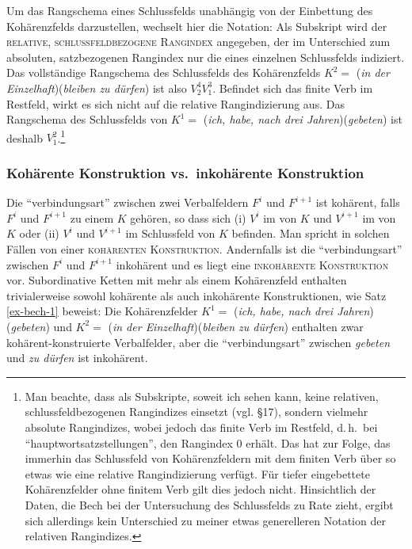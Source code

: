 Um das Rangschema eines Schlussfelds unabhängig von der Einbettung des Kohärenzfelds darzustellen, wechselt hier die Notation: Als Subskript wird der \textsc{relative, schlussfeldbezogene Rangindex} angegeben, der im Unterschied zum absoluten, satzbezogenen Rangindex nur die  eines einzelnen Schlussfelds indiziert. Das vollständige Rangschema des Schlussfelds des Kohärenzfelds $K^2 =$  ({\it in der Einzelhaft})({\it bleiben zu dürfen}) ist also $V^4_2 V^3_1$. Befindet sich das finite Verb im Restfeld, wirkt es sich nicht auf die relative Rangindizierung aus. Das Rangschema des Schlussfelds von $K^1 =$ ({\it ich, habe, nach drei Jahren})({\it gebeten}) ist deshalb $V^2_1$.\footnote{Man beachte, dass \cite{Bech:55} als Subskripte, soweit ich sehen kann, keine relativen, schlussfeldbezogenen Rangindizes einsetzt (vgl. \S 17), sondern vielmehr absolute Rangindizes, wobei jedoch das finite Verb im Restfeld, d.\,h.\ bei "`hauptwortsatzstellungen"', den Rangindex 0 erhält. Das hat zur Folge, das immerhin das Schlussfeld von Kohärenzfeldern mit dem finiten Verb über so etwas wie eine relative Rangindizierung verfügt. Für tiefer eingebettete Kohärenzfelder ohne finitem Verb gilt dies jedoch nicht. Hinsichtlich der Daten, die Bech bei der Untersuchung des Schlussfelds zu Rate zieht, ergibt sich allerdings kein Unterschied zu meiner etwas generelleren Notation der relativen Rangindizes.}     




\subsubsection*{Kohärente Konstruktion vs.\ inkohärente Konstruktion}

Die "`verbindungsart"' \citep[\S 71]{Bech:55} zwischen zwei Verbalfeldern $F^i$ und $F^{i+1}$ ist kohärent, falls $F^i$ und $F^{i+1}$ zu einem  $K$ gehören, so dass sich (i) $V^i$ im  von $K$ und $V^{i+1}$ im  von $K$ oder (ii) $V^i$ und $V^{i+1}$ im Schlussfeld von $K$ befinden. Man spricht in solchen Fällen von einer \textsc{kohärenten Konstruktion}. Andernfalls ist die "`verbindungsart"' zwischen $F^i$ und $F^{i+1}$ inkohärent und es liegt eine \textsc{inkohärente Konstruktion} vor. Subordinative Ketten mit mehr als einem Kohärenzfeld enthalten trivialerweise sowohl kohärente als auch inkohärente Konstruktionen, wie Satz \ref{ex-bech-1} beweist: Die Kohärenzfelder $K^1 =$ ({\it ich, habe, nach drei Jahren})({\it gebeten}) und $K^2 =$  ({\it in der Einzelhaft})({\it bleiben zu dürfen}) enthalten zwar kohärent-konstruierte Verbalfelder, aber die "`verbindungsart"' zwischen {\it gebeten} und {\it zu dürfen} ist inkohärent.

